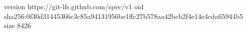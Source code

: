 version https://git-lfs.github.com/spec/v1
oid sha256:0f30d31445366c3c85a94131956be1ffc27b578aa42bcb2f4e14e4cda65944b5
size 8426
